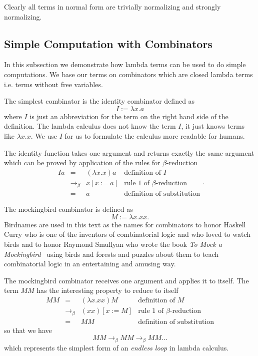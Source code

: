 Clearly all terms in normal form are trivially normalizing and strongly
normalizing.




\subsection{Simple Computation with Combinators}

In this subsection we demonstrate how lambda terms can be used to do simple
computations. We base our terms on combinators which are closed lambda terms
i.e. terms without free variables.

The simplest combinator is the identity combinator defined as
$$ I := \lambda x.a $$
where $I$ is just an abbreviation for the term on the right hand side of the
definition. The lambda calculus does not know the term $I$, it just knows
terms like $\lambda x.x$. We use $I$ for us to formulate the calculus more
readable for humans.

The identity function takes one argument and returns exactly the same
argument which can be proved by application of the rules for
$\beta$-reduction
$$\begin{array}{llll}
  I a & = &  (\lambda x.x) a & \text{definition of $I$} \\
       & \to_\beta & x[x:=a]  & \text{rule 1 of $\beta$-reduction} \\
       & =              & a           & \text{definition of substitution}
\end{array}.$$

The mockingbird combinator is defined as
$$ M := \lambda x. x x.$$
Birdnames are used in this text as the names for combinators to honor Haskell
Curry who is one of the inventors of combinatorial logic and who loved to
watch birds and to honor Raymond Smullyan who wrote the book \emph{To Mock a
  Mockingbird}~\cite{smullyan} using birds and forests and puzzles about them
to teach combinatorial logic in an entertaining and amusing way.

The mockingbird combinator receives one argument and applies it to itself. The
term $M M$ has the interesting property to reduce to itself
$$\begin{array}{llll}
  M M & = &  (\lambda x.x x) M  & \text{definition of $M$} \\
       & \to_\beta & (x x)[x:=M]   & \text{rule 1 of $\beta$-reduction} \\
       & =              & M M              & \text{definition of substitution}
\end{array}$$
so that we have
$$ MM \to_\beta MM \to_\beta MM \ldots$$
which represents the simplest form of an \emph{endless loop} in lambda
calculus.

